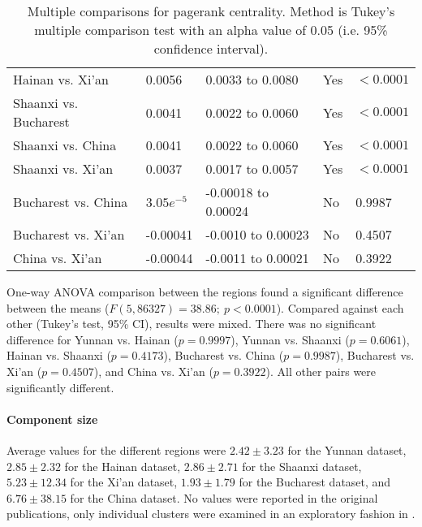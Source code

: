 \begin{table}[h]
\begin{mdframed}
\begin{tabular*}{\linewidth}{l|llll}
			Hainan vs. Xi'an & 0.0056 & 0.0033 to 0.0080 & Yes & $<0.0001$\\
			Shaanxi vs. Bucharest & 0.0041 & 0.0022 to 0.0060 & Yes & $<0.0001$\\
			Shaanxi vs. China & 0.0041 & 0.0022 to 0.0060 & Yes & $<0.0001$\\
			Shaanxi vs. Xi'an & 0.0037 &0.0017 to 0.0057 & Yes & $<0.0001$\\
			Bucharest vs. China & $3.05e^{-5}$ & -0.00018 to 0.00024 & No & 0.9987\\
			Bucharest vs. Xi'an & -0.00041 & -0.0010 to 0.00023 & No & 0.4507\\
			China vs. Xi'an & -0.00044 & -0.0011 to 0.00021 & No & 0.3922\\
			\hline
		\end{tabular*}
		\caption{Multiple comparisons for pagerank centrality. Method is Tukey's multiple comparison test with an alpha value of 0.05 (i.e. 95\% confidence interval).}
		\label{tab:pagerank_centrality_tukey}
	\end{mdframed}
\end{table}

One-way ANOVA comparison between the regions found a significant difference between the means ($F(5,86327) = 38.86; \: p<0.0001$). Compared against each other (Tukey's test, 95\% CI), results were mixed. There was no significant difference for Yunnan vs. Hainan ($p=0.9997$), Yunnan vs. Shaanxi ($p=0.6061$), Hainan vs. Shaanxi ($p=0.4173$), Bucharest vs. China ($p=0.9987$), Bucharest vs. Xi'an ($p=0.4507$), and China vs. Xi'an ($p=0.3922$). All other pairs were significantly different.

\paragraph{Component size} Average values for the different regions were $2.42\pm3.23$ for the Yunnan dataset, $2.85\pm2.32$ for the Hainan dataset, $2.86\pm2.71$ for the Shaanxi dataset, $5.23\pm12.34$ for the Xi'an dataset, $1.93\pm1.79$ for the Bucharest dataset, and $6.76\pm38.15$ for the China dataset. No values were reported in the original publications, only individual clusters were examined in an exploratory fashion in \cite{hainan_publication,shaanxi_publication,xian_publication}.

